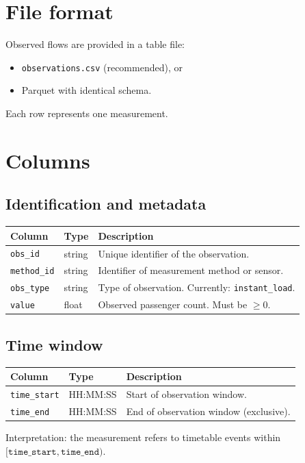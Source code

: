 \documentclass[11pt,a4paper]{article}
\begin{document}
\section{File format}

Observed flows are provided in a table file:
\begin{itemize}
    \item \texttt{observations.csv} (recommended), or
    \item Parquet with identical schema.
\end{itemize}

Each row represents one measurement.

\section{Columns}

\subsection{Identification and metadata}

\begin{longtable}{p{4cm}p{3cm}p{8cm}}
\toprule
Column & Type & Description \\
\midrule
\texttt{obs\_id} & string & Unique identifier of the observation. \\
\texttt{method\_id} & string & Identifier of measurement method or sensor. \\
\texttt{obs\_type} & string & Type of observation. Currently: \texttt{instant\_load}. \\
\texttt{value} & float & Observed passenger count. Must be $\ge 0$. \\
\bottomrule
\end{longtable}

\subsection{Time window}

\begin{longtable}{p{4cm}p{3cm}p{8cm}}
\toprule
Column & Type & Description \\
\midrule
\texttt{time\_start} & HH:MM:SS & Start of observation window. \\
\texttt{time\_end} & HH:MM:SS & End of observation window (exclusive). \\
\bottomrule
\end{longtable}

Interpretation: the measurement refers to timetable events within
$[\texttt{time\_start},\texttt{time\_end})$.
\end{document}

